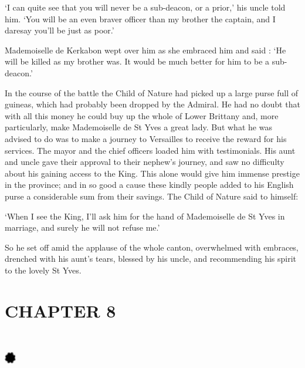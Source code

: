 \documentclass{article}
\begin{document}
\begin{center}
`I can quite see that you will never be a sub-deacon, or a prior,' his uncle told 
him. `You will be an even braver officer than my brother the captain, and I daresay 
you'll be just as poor.' 

Mademoiselle de Kerkabon wept over him as she embraced him and said : `He will 
be killed as my brother was. It would be much better for him to be a sub-deacon.' 

In the course of the battle the Child of Nature had picked up a large purse full 
of guineas, which had probably been dropped by the Admiral. He had no doubt that 
with all this money he could buy up the whole of Lower Brittany and, more particularly, 
make Mademoiselle de St Yves a great lady. But what he was advised to do was to 
make a journey to Versailles to receive the reward for his services. The mayor 
and the chief officers loaded him with testimonials. His aunt and uncle gave their 
approval to their nephew's journey, and saw no difficulty about his gaining access 
to the King. This alone would give him immense prestige in the province; and in 
so good a cause these kindly people added to his English purse a considerable sum 
from their savings. The Child of Nature said to himself: 

`When I see the King, I'll ask him for the hand of Mademoiselle de St Yves in marriage, 
and surely he will not refuse me.' 

So he set off amid the applause of the whole canton, overwhelmed with embraces, 
drenched with his aunt's tears, blessed by his uncle, and recommending his spirit 
to the lovely St Yves.\pagebreak{} 

\section*{\textbf{CHAPTER 8  }}

\section*{%
\includegraphics[width=14pt, height=15pt, keepaspectratio=true]{Zadig or L'Ingenu - Voltaire-fig030.jpg}
}

 


\end{center}
\end{document}
